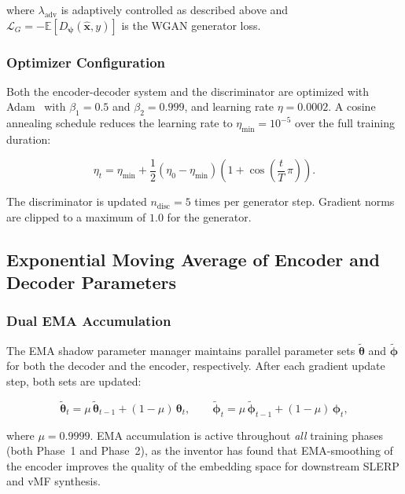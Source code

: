 \documentclass[12pt,letterpaper]{article}
\newcommand{\bx}{\mathbf{x}}
\newcommand{\btheta}{\bm{\theta}}
\newcommand{\bphi}{\bm{\phi}}
\newcommand{\bpsi}{\bm{\psi}}
\newcommand{\EE}{\mathbb{E}}
\begin{document}
where $\lambda_{\text{adv}}$ is adaptively controlled as described above
and $\mathcal{L}_G = -\EE[D_{\bpsi}(\hat{\bx}, y)]$ is the WGAN generator
loss.

\subsubsection{Optimizer Configuration}

Both the encoder-decoder system and the discriminator are optimized with
Adam~\cite{kingma2015} with $\beta_1 = 0.5$ and $\beta_2 = 0.999$, and
learning rate $\eta = 0.0002$.  A cosine annealing schedule reduces the
learning rate to $\eta_{\min} = 10^{-5}$ over the full training duration:

\begin{equation}
  \eta_t = \eta_{\min} + \frac{1}{2}(\eta_0 - \eta_{\min})
    \left(1 + \cos\!\left(\frac{t}{T}\,\pi\right)\right).
  \label{eq:lr}
\end{equation}

The discriminator is updated $n_{\text{disc}} = 5$ times per generator step.
Gradient norms are clipped to a maximum of $1.0$ for the generator.

\subsection{Exponential Moving Average of Encoder and Decoder Parameters}

\subsubsection{Dual EMA Accumulation}

The EMA shadow parameter manager maintains parallel parameter sets
$\tilde{\btheta}$ and $\tilde{\bphi}$ for both the decoder and the encoder,
respectively.  After each gradient update step, both sets are updated:

\begin{equation}
  \tilde{\btheta}_t = \mu\,\tilde{\btheta}_{t-1} + (1 - \mu)\,\btheta_t,
  \qquad
  \tilde{\bphi}_t = \mu\,\tilde{\bphi}_{t-1} + (1 - \mu)\,\bphi_t,
  \label{eq:ema}
\end{equation}

where $\mu = 0.9999$.  EMA accumulation is active throughout \emph{all}
training phases (both Phase~1 and Phase~2), as the inventor has found that
EMA-smoothing of the encoder improves the quality of the embedding space for
downstream SLERP and vMF synthesis.
\end{document}
